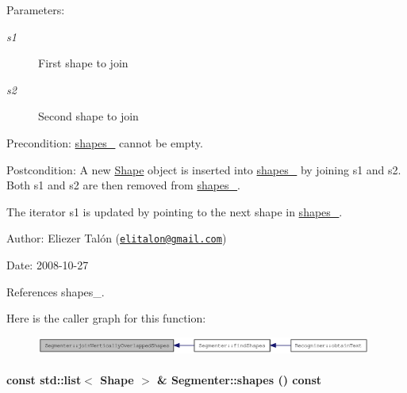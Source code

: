 \begin{Desc}
\item[Parameters:]
\begin{description}
\item[{\em s1}]First shape to join \item[{\em s2}]Second shape to join\end{description}
\end{Desc}
\begin{Desc}
\item[Precondition:]\hyperlink{class_segmenter_41b94ede2829063e0937dc150756e77e}{shapes\_\-} cannot be empty.\end{Desc}
\begin{Desc}
\item[Postcondition:]A new \hyperlink{class_shape}{Shape} object is inserted into \hyperlink{class_segmenter_41b94ede2829063e0937dc150756e77e}{shapes\_\-} by joining s1 and s2. Both s1 and s2 are then removed from \hyperlink{class_segmenter_41b94ede2829063e0937dc150756e77e}{shapes\_\-}. 

The iterator s1 is updated by pointing to the next shape in \hyperlink{class_segmenter_41b94ede2829063e0937dc150756e77e}{shapes\_\-}.\end{Desc}
\begin{Desc}
\item[Author:]Eliezer Talón (\href{mailto:elitalon@gmail.com}{\tt elitalon@gmail.com}) \end{Desc}
\begin{Desc}
\item[Date:]2008-10-27 \end{Desc}


References shapes\_\-.

Here is the caller graph for this function:\nopagebreak
\begin{figure}[H]
\begin{center}
\leavevmode
\includegraphics[width=313pt]{class_segmenter_a6fc98922155143cf36f542118c33f3a_icgraph}
\end{center}
\end{figure}
\hypertarget{class_segmenter_7ddded12f26e94e6f5cba2752d2c4142}{
\paragraph[{shapes}]{\setlength{\rightskip}{0pt plus 5cm}const std::list$<$ {\bf Shape} $>$ \& Segmenter::shapes () const}\hfill}
\label{class_segmenter_7ddded12f26e94e6f5cba2752d2c4142}


